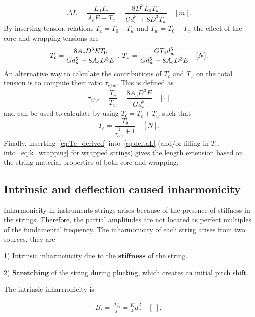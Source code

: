 \documentclass{article}
\begin{document}
\begin{sloppy}
%
\begin{equation}
    \Delta L = \frac{L_0T_c}{A_cE + T_c} = \frac{8D^3L_0T_w}{Gd_w^5 + 8D^3T_w} \quad [m].
\end{equation}
%
By inserting tension relations $T_c = T_0 - T_w$ and $T_w = T_0 - T_c$, the effect of the core and wrapping tensions are
%
\begin{equation}
    T_c = \frac{8A_cD^3ET_0}{Gd_w^5+8A_cD^3E}\text{ , } \newline
    T_w = \frac{GT_0d_w^5}{Gd_w^5 + 8A_cD^3E} \quad [N].
\end{equation}
%
An alternative way to calculate the contributions of $T_c$ and $T_w$ on the total tension is to compute their ratio $\tau_{c/w}$. This is defined as
%
\begin{equation}
    \tau_{c/w} = \frac{T_c}{T_w} = \frac{8A_cD^3E}{Gd_w^5}  \quad [\cdot] 
\end{equation}
%
and can be used to calculate by using $T_0 = T_c + T_w$ such that
%
\begin{equation}\label{eq:Tc_derived}
    T_c = \frac{T_0}{\frac{1}{\tau_{c/w}}+1} \quad [N].
\end{equation}
%
Finally, inserting~\eqref{eq:Tc_derived} into~\eqref{eq:deltaL} (and/or filling in $T_w$ into~\eqref{eq:k_wrapping} for wrapped strings) gives the length extension based on the string-material properties of both core and wrapping. 
%
%
%
%
\subsection{Intrinsic and deflection caused inharmonicity}
Inharmonicity in instruments strings arises because of the presence of stiffness in the strings. Therefore, the partial amplitudes are not located as perfect multiples of the fundamental frequency.
The inharmonicity of each string arises from two sources, they are

1) Intrinsic inharmonicity due to the $\textbf{stiffness}$ of the string.

2) $\textbf{Stretching}$ of the string during plucking, which creates an initial pitch shift.

\noindent The intrinsic inharmonicity is~\cite{rossing:science_of_string_instruments}

\begin{align}
    B_i = \frac {\Delta f_i}{f} = \frac {K}{4} d_c^2  \quad [\cdot],
\end{align}


\end{sloppy}
\end{document}
